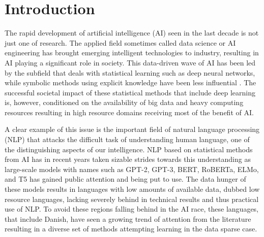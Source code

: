 \documentclass[main.tex]{subfiles}
\begin{document}
\chapter{Introduction}
The rapid development of artificial intelligence (AI) seen in the last decade is not just one of research.
The applied field sometimes called data science or AI engineering has brought emerging intelligent technologies to industry, resulting in AI playing a significant role in society.
This data-driven wave of AI has been led by the subfield that deals with statistical learning such as deep neural networks, while symbolic methods using explicit knowledge have been less influential \cite[p. 1]{lecun2015deep}.
The successful societal impact of these statistical methods that include deep learning is, however, conditioned on the availability of big data and heavy computing resources resulting in high resource domains receiving most of the benefit of AI.

A clear example of this issue is the important field of natural language processing (NLP) that attacks the difficult task of understanding human language, one of the distinguishing aspects of our intelligence.
NLP based on statistical methods from AI has in recent years taken sizable strides towards this understanding as large-scale models with names such as GPT-2, GPT-3, BERT, RoBERTa, ELMo, and T5 has gained public attention and being put to use.
The data hunger of these models results in languages with low amounts of available data, dubbed low resource languages, lacking severely behind in technical results and thus practical use of NLP.
To avoid these regions falling behind in the AI race, these languages, that include Danish, have seen a growing trend of attention from the literature resulting in a diverse set of methods attempting learning in the data sparse case. \cite{hedderich2021survey}
\end{document}
